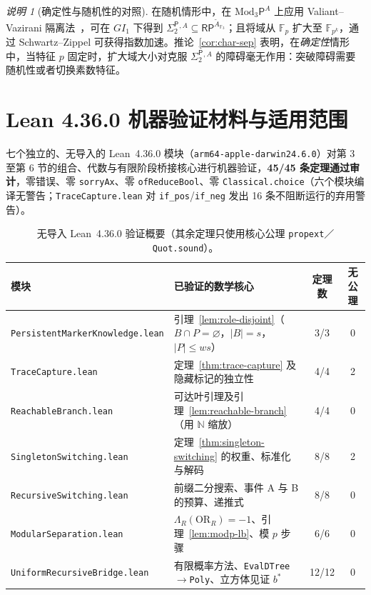 \documentclass[11pt,a4paper]{article}
\theoremstyle{definition}
\theoremstyle{remark}
\newtheorem{remark}[theorem]{说明}
\newcommand{\RP}{\mathsf{RP}}
\newcommand{\Modthree}{\mathrm{Mod}_3\mathsf{P}}
\newcommand{\SigTwo}{\Sigma_2^{\mathsf{P}}}
\newcommand{\OR}{\mathrm{OR}}
\newcommand{\F}{\mathbb{F}}
\newcommand{\GI}{GI_1}
\begin{document}
\begin{remark}[确定性与随机性的对照]
在随机情形中，在 $\Modthree^A$ 上应用 Valiant--Vazirani 隔离法~\cite{ValiantVazirani1986}，可在 $\GI$ 下得到 $\SigTwo{}^{,A}\subseteq\RP^{\widetilde A_{\F_3}}$；且将域从 $\F_p$ 扩大至 $\F_{p^k}$，通过 Schwartz--Zippel 可获得指数加速。推论~\ref{cor:char-sep} 表明，在\emph{确定性}情形中，当特征 $p$ 固定时，扩大域大小对克服 $\SigTwo{}^{,A}$ 的障碍毫无作用：突破障碍需要随机性或者切换素数特征。
\end{remark}

\appendix
\section{Lean 4.36.0 机器验证材料与适用范围}

七个独立的、无导入的 Lean~4.36.0 模块（\texttt{arm64-apple-darwin24.6.0}）对第 3 至第 6 节的组合、代数与有限阶段桥接核心进行机器验证，\textbf{45/45 条定理通过审计}，零错误、零 \texttt{sorryAx}、零 \texttt{ofReduceBool}、零 \texttt{Classical.choice}（六个模块编译无警告；\texttt{TraceCapture.lean} 对 \texttt{if\_pos}/\texttt{if\_neg} 发出 16 条不阻断运行的弃用警告）。

\begin{table}[!htbp]
\centering
\small
\begin{tabularx}{\linewidth}{@{}lXcc@{}}
\toprule
\textbf{模块} & \textbf{已验证的数学核心} & \textbf{定理数} & \textbf{无公理}\\
\midrule
\texttt{PersistentMarkerKnowledge.lean} & 引理~\ref{lem:role-disjoint}（$B\cap P=\varnothing$，$|B|=s$，$|P|\le ws$） & 3/3 & 0\\
\texttt{TraceCapture.lean} & 定理~\ref{thm:trace-capture} 及隐藏标记的独立性 & 4/4 & 2\\
\texttt{ReachableBranch.lean} & 可达叶引理及引理~\ref{lem:reachable-branch}（用 $\mathbb N$ 缩放） & 4/4 & 0\\
\texttt{SingletonSwitching.lean} & 定理~\ref{thm:singleton-switching} 的权重、标准化与解码 & 8/8 & 2\\
\texttt{RecursiveSwitching.lean} & 前缀二分搜索、事件 A 与 B 的预算、递推式 & 8/8 & 0\\
\texttt{ModularSeparation.lean} & $\Lambda_R(\OR_R)=-1$、引理~\ref{lem:modp-lb}、模 $p$ 步骤 & 6/6 & 0\\
\texttt{UniformRecursiveBridge.lean} & 有限概率方法、\texttt{EvalDTree}$\to$\texttt{Poly}、立方体见证 $b^*$ & 12/12 & 0\\
\bottomrule
\end{tabularx}
\caption{无导入 Lean~4.36.0 验证概要（其余定理只使用核心公理 \texttt{propext}／\texttt{Quot.sound}）。}
\end{table}
\end{document}

